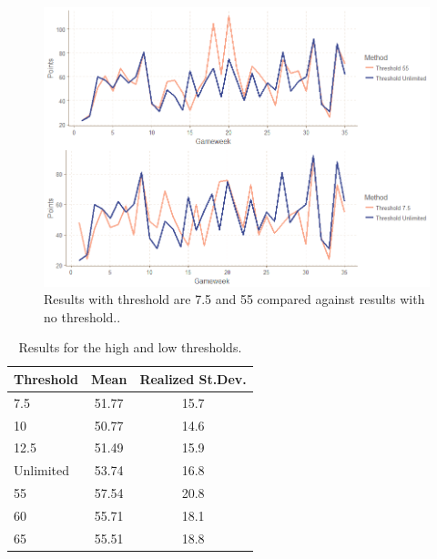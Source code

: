 \begin{figure}[H]
    \centering
    \includegraphics[scale=0.5]{fig/chapter_7/var_threshold.png}
    \caption{Results with threshold are 7.5 and 55 compared against results with no threshold..}
\label{fig:performance_different_threshold}    
\end{figure}%
\newpar

\begin{table}[H]
\centering
\begin{tabular}{@{}lcc@{}}
\toprule
Threshold & Mean & Realized St.Dev. \\ \midrule
7.5       & 51.77 & 15.7   \\
10        & 50.77 & 14.6   \\        %
12.5      & 51.49 & 15.9   \\
Unlimited & 53.74 & 16.8   \\
55        & 57.54 & 20.8   \\
60        & 55.71 & 18.1   \\
65        & 55.51 & 18.8   \\ \bottomrule 
\end{tabular}
\caption{Results for the high and low thresholds.}
\label{tab_high_low_thresholds}
\end{table}


